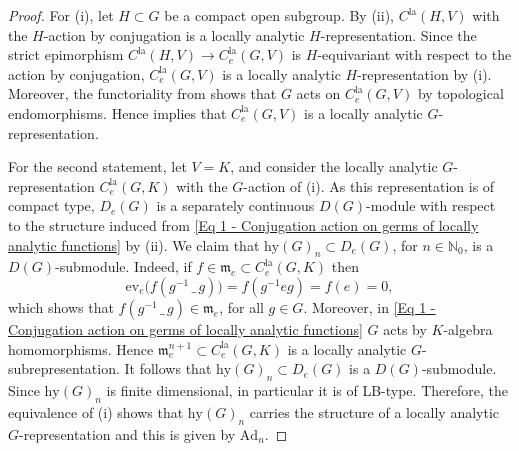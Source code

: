 \documentclass[a4paper, reqno, 10pt]{amsart}
\theoremstyle{definition}
\numberwithin{equation}{section}
\newcommand{\Ad}{{\mathrm{Ad}}}
\newcommand{\blank}{{\,\_\,}}
\newcommand{\hy}{{\mathrm{hy}}}
\newcommand{\la}{{\mathrm{la}}}
\newcommand{\ra}{\rightarrow}
\newcommand{\BN}{{\mathbb {N}}}
\newcommand{\Fm}{{\mathfrak {m}}}
\begin{document}
\begin{proof}
	For (i), let $H\subset G$ be a compact open subgroup. 
	By  (ii), $C^\la(H,V)$ with the $H$-action by conjugation is a locally analytic $H$-representation.
	Since the strict epimorphism $C^\la(H,V) \ra C^\la_e(G,V)$ is $H$-equivariant with respect to the action by conjugation, $C^\la_e(G,V)$ is a locally analytic $H$-representation by  (i).
	Moreover, the functoriality from  shows that $G$ acts on $C^\la_e(G,V)$ by topological endomorphisms.
	Hence  implies that $C^\la_e(G,V)$ is a locally analytic $G$-representation.
	
	
	For the second statement, let $V = K$, and consider the locally analytic $G$-representation $C^\la_e(G,K)$ with the $G$-action of (i).
	As this representation is of compact type, $D_e(G)$ is a separately continuous $D(G)$-module with respect to the structure induced from \eqref{Eq 1 - Conjugation action on germs of locally analytic functions} by  (ii).
	We claim that $\hy(G)_n \subset D_e(G)$, for $n\in \BN_0$, is a $D(G)$-submodule.
	Indeed, if $f\in \Fm_e\subset C^\la_e(G,K)$ then
	\begin{equation*}
		\mathrm{ev}_e \big(f(g^{-1} \blank g) \big) = f(g^{-1} e g) = f(e) = 0, 
	\end{equation*}
	which shows that $f(g^{-1}\blank g)\in \Fm_e$, for all $g\in G$.
	Moreover, in \eqref{Eq 1 - Conjugation action on germs of locally analytic functions} $G$ acts by $K$-algebra homomorphisms.
	Hence $\Fm_e^{n+1} \subset C^\la_e(G,K)$ is a locally analytic $G$-subrepresentation.
	It follows that $\hy(G)_n \subset D_e(G)$ is a $D(G)$-submodule.
	Since $\hy(G)_n$ is finite dimensional, in particular it is of LB-type.
	Therefore, the equivalence of  (i) shows that $\hy(G)_n$ carries the structure of a locally analytic $G$-representation and this is given by $\Ad_n$.
\end{proof}
\end{document}
